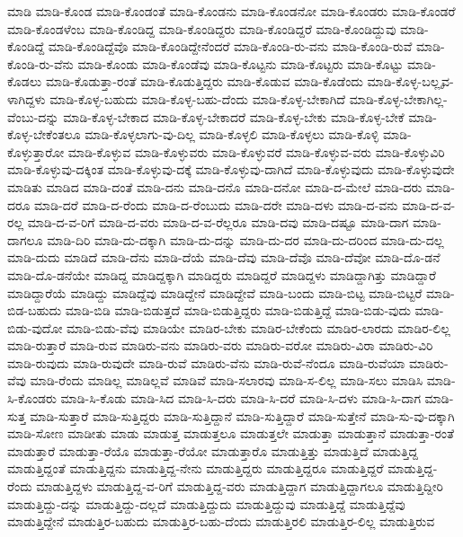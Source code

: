 {ಮಾಡಿ
ಮಾಡಿ-ಕೊಂಡ
ಮಾಡಿ-ಕೊಂಡಂತೆ
ಮಾಡಿ-ಕೊಂಡನು
ಮಾಡಿ-ಕೊಂಡನೋ
ಮಾಡಿ-ಕೊಂಡರು
ಮಾಡಿ-ಕೊಂಡರೆ
ಮಾಡಿ-ಕೊಂಡಳೆಂಬ
ಮಾಡಿ-ಕೊಂಡಿದ್ದ
ಮಾಡಿ-ಕೊಂಡಿದ್ದರು
ಮಾಡಿ-ಕೊಂಡಿದ್ದರೆ
ಮಾಡಿ-ಕೊಂಡಿದ್ದುವು
ಮಾಡಿ-ಕೊಂಡಿದ್ದೆ
ಮಾಡಿ-ಕೊಂಡಿದ್ದೆವೊ
ಮಾಡಿ-ಕೊಂಡಿದ್ದೇನೆಂದರೆ
ಮಾಡಿ-ಕೊಂಡಿ-ರು-ವನು
ಮಾಡಿ-ಕೊಂಡಿ-ರುವೆ
ಮಾಡಿ-ಕೊಂಡಿ-ರು-ವೆನು
ಮಾಡಿ-ಕೊಂಡು
ಮಾಡಿ-ಕೊಂಡೆವು
ಮಾಡಿ-ಕೊಟ್ಟನು
ಮಾಡಿ-ಕೊಟ್ಟರು
ಮಾಡಿ-ಕೊಟ್ಟು
ಮಾಡಿ-ಕೊಡಲು
ಮಾಡಿ-ಕೊಡುತ್ತಾ-ರಂತೆ
ಮಾಡಿ-ಕೊಡುತ್ತಿದ್ದರು
ಮಾಡಿ-ಕೊಡುವ
ಮಾಡಿ-ಕೊಡೆಂದು
ಮಾಡಿ-ಕೊಳ್ಳ-ಬಲ್ಲೃವ-ಳಾಗಿದ್ದಳು
ಮಾಡಿ-ಕೊಳ್ಳ-ಬಹುದು
ಮಾಡಿ-ಕೊಳ್ಳ-ಬಹು-ದೆಂದು
ಮಾಡಿ-ಕೊಳ್ಳ-ಬೇಕಾಗಿದೆ
ಮಾಡಿ-ಕೊಳ್ಳ-ಬೇಕಾಗಿಲ್ಲ-ವೆಂಬು-ದನ್ನು
ಮಾಡಿ-ಕೊಳ್ಳ-ಬೇಕಾದ
ಮಾಡಿ-ಕೊಳ್ಳ-ಬೇಕಾದರೆ
ಮಾಡಿ-ಕೊಳ್ಳ-ಬೇಕು
ಮಾಡಿ-ಕೊಳ್ಳ-ಬೇಕೆ
ಮಾಡಿ-ಕೊಳ್ಳ-ಬೇಕೆಂತಲೂ
ಮಾಡಿ-ಕೊಳ್ಳಲಾಗು-ವು-ದಿಲ್ಲ
ಮಾಡಿ-ಕೊಳ್ಳಲಿ
ಮಾಡಿ-ಕೊಳ್ಳಲು
ಮಾಡಿ-ಕೊಳ್ಳಿ
ಮಾಡಿ-ಕೊಳ್ಳುತ್ತಾರೋ
ಮಾಡಿ-ಕೊಳ್ಳುವ
ಮಾಡಿ-ಕೊಳ್ಳುವರು
ಮಾಡಿ-ಕೊಳ್ಳುವರೆ
ಮಾಡಿ-ಕೊಳ್ಳುವ-ವರು
ಮಾಡಿ-ಕೊಳ್ಳುವಿರಿ
ಮಾಡಿ-ಕೊಳ್ಳುವು-ದಕ್ಕಿಂತ
ಮಾಡಿ-ಕೊಳ್ಳುವು-ದಕ್ಕೆ
ಮಾಡಿ-ಕೊಳ್ಳುವು-ದಾಗಿದೆ
ಮಾಡಿ-ಕೊಳ್ಳುವುದು
ಮಾಡಿ-ಕೊಳ್ಳುವುದೇ
ಮಾಡಿತು
ಮಾಡಿದ
ಮಾಡಿ-ದಂತೆ
ಮಾಡಿ-ದನು
ಮಾಡಿ-ದನೊ
ಮಾಡಿ-ದನೋ
ಮಾಡಿ-ದ-ಮೇಲೆ
ಮಾಡಿ-ದರು
ಮಾಡಿ-ದರೂ
ಮಾಡಿ-ದರೆ
ಮಾಡಿ-ದ-ರೆಂದು
ಮಾಡಿ-ದ-ರೆಂಬುದು
ಮಾಡಿ-ದರೇ
ಮಾಡಿ-ದಳು
ಮಾಡಿ-ದ-ವನು
ಮಾಡಿ-ದ-ವ-ರಲ್ಲ
ಮಾಡಿ-ದ-ವ-ರಿಗೆ
ಮಾಡಿ-ದ-ವರು
ಮಾಡಿ-ದ-ವ-ರೆಲ್ಲರೂ
ಮಾಡಿ-ದವು
ಮಾಡಿ-ದಷ್ಟೂ
ಮಾಡಿ-ದಾಗ
ಮಾಡಿ-ದಾಗಲೂ
ಮಾಡಿ-ದಿರಿ
ಮಾಡಿ-ದು-ದಕ್ಕಾಗಿ
ಮಾಡಿ-ದು-ದನ್ನು
ಮಾಡಿ-ದು-ದರ
ಮಾಡಿ-ದು-ದರಿಂದ
ಮಾಡಿ-ದು-ದಲ್ಲ
ಮಾಡಿ-ದುದು
ಮಾಡಿದೆ
ಮಾಡಿ-ದೆನು
ಮಾಡಿ-ದೆಯೆ
ಮಾಡಿ-ದೆವು
ಮಾಡಿ-ದೆವೊ
ಮಾಡಿ-ದೆವೋ
ಮಾಡಿ-ದೊ-ಡನೆ
ಮಾಡಿ-ದೊ-ಡನೆಯೇ
ಮಾಡಿದ್ದ
ಮಾಡಿದ್ದಕ್ಕಾಗಿ
ಮಾಡಿದ್ದರು
ಮಾಡಿದ್ದರೆ
ಮಾಡಿದ್ದಳು
ಮಾಡಿದ್ದಾಗಿತ್ತು
ಮಾಡಿದ್ದಾರೆ
ಮಾಡಿದ್ದಾರೆಯೆ
ಮಾಡಿದ್ದು
ಮಾಡಿದ್ದೆವು
ಮಾಡಿದ್ದೇನೆ
ಮಾಡಿದ್ದೇವೆ
ಮಾಡಿ-ಬಂದು
ಮಾಡಿ-ಬಿಟ್ಟ
ಮಾಡಿ-ಬಿಟ್ಟರೆ
ಮಾಡಿ-ಬಿಡ-ಬಹುದು
ಮಾಡಿ-ಬಿಡಿ
ಮಾಡಿ-ಬಿಡುತ್ತದೆ
ಮಾಡಿ-ಬಿಡುತ್ತಿದ್ದರು
ಮಾಡಿ-ಬಿಡುತ್ತಿದ್ದೆ
ಮಾಡಿ-ಬಿಡು-ವುದು
ಮಾಡಿ-ಬಿಡು-ವುದೋ
ಮಾಡಿ-ಬಿಡು-ವೆವು
ಮಾಡಿಯೇ
ಮಾಡಿರ-ಬೇಕು
ಮಾಡಿರ-ಬೇಕೆಂದು
ಮಾಡಿರ-ಲಾರದು
ಮಾಡಿರ-ಲಿಲ್ಲ
ಮಾಡಿ-ರುತ್ತಾರೆ
ಮಾಡಿ-ರುವ
ಮಾಡಿರು-ವನು
ಮಾಡಿರು-ವರು
ಮಾಡಿರು-ವರೋ
ಮಾಡಿರು-ವಿರಾ
ಮಾಡಿರು-ವಿರಿ
ಮಾಡಿ-ರುವುದು
ಮಾಡಿ-ರುವುದೇ
ಮಾಡಿ-ರುವೆ
ಮಾಡಿರು-ವೆನು
ಮಾಡಿ-ರುವೆ-ನೆಂದೂ
ಮಾಡಿ-ರುವೆಯಾ
ಮಾಡಿರು-ವೆವು
ಮಾಡಿ-ರೆಂದು
ಮಾಡಿಲ್ಲ
ಮಾಡಿಲ್ಲವೆ
ಮಾಡಿವೆ
ಮಾಡಿ-ಸಲಾರವು
ಮಾಡಿ-ಸ-ಲಿಲ್ಲ
ಮಾಡಿ-ಸಲು
ಮಾಡಿಸಿ
ಮಾಡಿ-ಸಿ-ಕೊಂಡರು
ಮಾಡಿ-ಸಿ-ಕೊಡು
ಮಾಡಿ-ಸಿದ
ಮಾಡಿ-ಸಿ-ದರು
ಮಾಡಿ-ಸಿ-ದರೆ
ಮಾಡಿ-ಸಿ-ದಳು
ಮಾಡಿ-ಸಿ-ದಾಗ
ಮಾಡಿ-ಸುತ್ತ
ಮಾಡಿ-ಸುತ್ತಾರೆ
ಮಾಡಿ-ಸುತ್ತಿದ್ದರು
ಮಾಡಿ-ಸುತ್ತಿದ್ದಾನೆ
ಮಾಡಿ-ಸುತ್ತಿದ್ದಾರೆ
ಮಾಡಿ-ಸುತ್ತೇನೆ
ಮಾಡಿ-ಸು-ವು-ದಕ್ಕಾಗಿ
ಮಾಡಿ-ಸೋಣ
ಮಾಡೀತು
ಮಾಡು
ಮಾಡುತ್ತ
ಮಾಡುತ್ತಲೂ
ಮಾಡುತ್ತಲೇ
ಮಾಡುತ್ತಾ
ಮಾಡುತ್ತಾನೆ
ಮಾಡುತ್ತಾ-ರಂತೆ
ಮಾಡುತ್ತಾರೆ
ಮಾಡುತ್ತಾ-ರೆಯೊ
ಮಾಡುತ್ತಾ-ರೆಯೋ
ಮಾಡುತ್ತಾರೊ
ಮಾಡುತ್ತಿತ್ತು
ಮಾಡುತ್ತಿದೆ
ಮಾಡುತ್ತಿದ್ದ
ಮಾಡುತ್ತಿದ್ದಂತೆ
ಮಾಡುತ್ತಿದ್ದನು
ಮಾಡುತ್ತಿದ್ದ-ನೇನು
ಮಾಡುತ್ತಿದ್ದರು
ಮಾಡುತ್ತಿದ್ದರೂ
ಮಾಡುತ್ತಿದ್ದರೆ
ಮಾಡುತ್ತಿದ್ದ-ರೆಂದು
ಮಾಡುತ್ತಿದ್ದಳು
ಮಾಡುತ್ತಿದ್ದ-ವ-ರಿಗೆ
ಮಾಡುತ್ತಿದ್ದ-ವರು
ಮಾಡುತ್ತಿದ್ದಾಗ
ಮಾಡುತ್ತಿದ್ದಾಗಲೂ
ಮಾಡುತ್ತಿದ್ದೀರಿ
ಮಾಡುತ್ತಿದ್ದು-ದನ್ನು
ಮಾಡುತ್ತಿದ್ದು-ದಲ್ಲದೆ
ಮಾಡುತ್ತಿದ್ದುದು
ಮಾಡುತ್ತಿದ್ದುವು
ಮಾಡುತ್ತಿದ್ದೆ
ಮಾಡುತ್ತಿದ್ದೆವು
ಮಾಡುತ್ತಿದ್ದೇನೆ
ಮಾಡುತ್ತಿರ-ಬಹುದು
ಮಾಡುತ್ತಿರ-ಬಹು-ದೆಂದು
ಮಾಡುತ್ತಿರಲಿ
ಮಾಡುತ್ತಿರ-ಲಿಲ್ಲ
ಮಾಡುತ್ತಿರುವ
}

